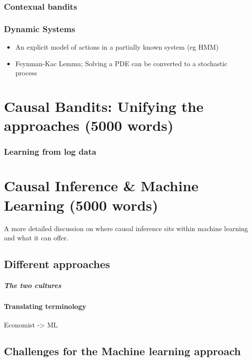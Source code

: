 \documentclass[11pt,a4paper,oneside]{book}
\begin{document}
\subsection*{Contexual bandits}


\subsection*{Dynamic Systems}
\begin{itemize}
\item An explicit model of actions in a partially known system (eg HMM)
\item Feynman-Kac Lemma; Solving a PDE can be converted to a stochastic process
\end{itemize}


\chapter*{Causal Bandits: Unifying the approaches (5000 words)}

\subsection*{Learning from log data}



\chapter*{Causal Inference \& Machine Learning (5000 words)}
A more detailed discussion on where causal inference sits within machine learning and what it can offer.



\section*{Different approaches}
\paragraph{The two cultures}


\subsubsection*{Translating terminology}
Economist -> ML

\section*{Challenges for the Machine learning approach}
\end{document}
